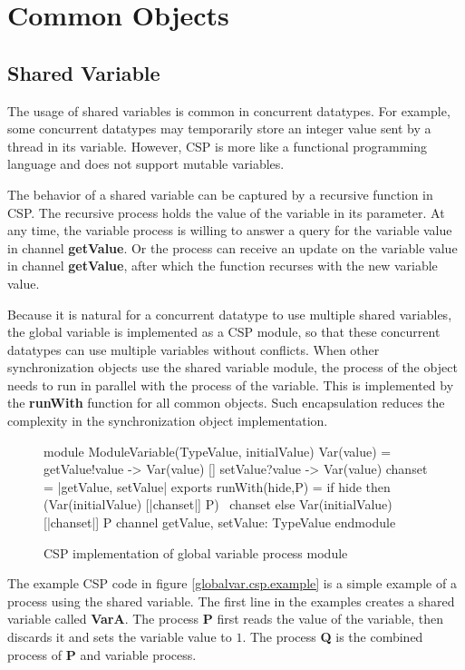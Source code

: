 \documentclass{article}
\begin{document}
\section{Common Objects}
\subsection{Shared Variable}
The usage of shared variables is common in concurrent datatypes. For example, some concurrent datatypes may temporarily store an integer value sent by a thread in its variable. However, CSP is more like a functional programming language and does not support mutable variables. 

The behavior of a shared variable can be captured by a recursive function in CSP. The recursive process holds the value of the variable in its parameter. At any time, the variable process is willing to answer a query for the variable value in channel \textbf{getValue}. Or the process can receive an update on the variable value in channel \textbf{getValue}, after which the function recurses with the new variable value.

Because it is natural for a concurrent datatype to use multiple shared variables, the global variable is implemented as a CSP module, so that these concurrent datatypes can use multiple variables without conflicts. When other synchronization objects use the shared variable module, the process of the object needs to run in parallel with the process of the variable. This is implemented by the \textbf{runWith} function for all common objects. Such encapsulation reduces the complexity in the synchronization object implementation.

\begin{figure}[hbtp]
\begin{cspm}
module ModuleVariable(TypeValue, initialValue)
  Var(value) = getValue!value -> Var(value)
            [] setValue?value -> Var(value)
  chanset = {|getValue, setValue|}
exports
  runWith(hide,P) = if hide then (Var(initialValue) [|chanset|] P) \ chanset
                            else  Var(initialValue) [|chanset|] P
  channel getValue, setValue: TypeValue
endmodule
\end{cspm}
\caption{CSP implementation of global variable process module}
\label{globalvar.csp}
\end{figure}

The example CSP code in figure \ref{globalvar.csp.example} is a simple example of a process using the shared variable. The first line in the examples creates a shared variable called \textbf{VarA}. The process \textbf{P} first reads the value of the variable, then discards it and sets the variable value to $1$. The process \textbf{Q} is the combined process of \textbf{P} and variable process.
\end{document}

